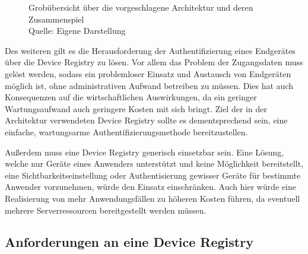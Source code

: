\begin{figure}
    \centering
    \caption{Grobübersicht über die vorgeschlagene Architektur und deren Zusammenspiel\\ Quelle: Eigene Darstellung}
    \label{fig:high_level}
\end{figure}

Des weiteren gilt es die Herausforderung der Authentifizierung eines Endgerätes über die Device Registry zu lösen. Vor allem das Problem der Zugangsdaten muss gelöst werden, sodass ein problemloser Einsatz und Austausch von Endgeräten möglich ist, ohne administrativen Aufwand betreiben zu müssen. Dies hat auch Konsequenzen auf die wirtschaftlichen Auswirkungen, da ein geringer Wartungsaufwand auch geringere Kosten mit sich bringt. Ziel der in der Architektur verwendeten Device Registry sollte es dementsprechend sein, eine einfache, wartungsarme Authentifizierungsmethode bereitzustellen.

Außerdem muss eine Device Registry generisch einsetzbar sein. Eine Lösung, welche nur Geräte eines Anwenders unterstützt und keine Möglichkeit bereitstellt, eine Sichtbarkeitseinstellung oder Authentisierung gewisser Geräte für bestimmte Anwender vorzunehmen, würde den Einsatz einschränken. Auch hier würde eine Realisierung von mehr Anwendungsfällen zu höheren Kosten führen, da eventuell mehrere Serverressourcen bereitgestellt werden müssen.

\subsection*{Anforderungen an eine Device Registry}

